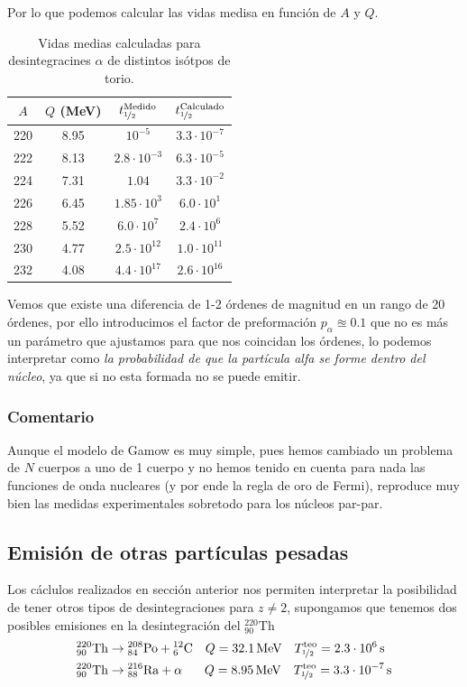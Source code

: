 Por lo que podemos calcular las vidas medisa en función de $A$ y $Q$.
\begin{table}[h!]
\centering
\begin{tabular}{|cccc|}
\hline
$A$ & $Q$ (MeV) & $t^\mathrm{Medido}_{\nicefrac{1}{2}}$  & $t^\mathrm{Calculado}_{\nicefrac{1}{2}}$  \\ 
\hline \hline
220 & 8.95 & $10^{-5}$ & $3.3 \cdot 10^{-7}$ \\
222 & 8.13 & $2.8 \cdot 10^{-3}$ & $6.3 \cdot 10^{-5}$ \\
224 & 7.31 & $1.04$ & $3.3 \cdot 10^{-2}$ \\
226 & 6.45 & $1.85 \cdot 10^{3}$ & $6.0 \cdot 10^{1}$ \\
228 & 5.52 & $6.0 \cdot 10^{7}$ & $2.4 \cdot 10^{6}$ \\
230 & 4.77 & $2.5 \cdot 10^{12}$ & $1.0 \cdot 10^{11}$ \\
232 & 4.08 & $4.4 \cdot 10^{17}$ & $2.6 \cdot 10^{16}$ \\
\hline
\end{tabular}
\caption{Vidas medias calculadas para desintegracines $\alpha$ de distintos isótpos de torio.}
\label{tab: desintegraciones del torio}
\end{table}

Vemos que existe una diferencia de 1-2 órdenes de magnitud en un rango de 20 órdenes, por ello introducimos el factor de preformación $p_\alpha\approxeq 0.1$ que no es más un parámetro que ajustamos para que nos coincidan los órdenes, lo podemos interpretar como \textit{la probabilidad de que la partícula alfa se forme dentro del núcleo}, ya que si no esta formada no se puede emitir.
\newpage
\subsubsection{Comentario}
Aunque el modelo de Gamow es muy simple, pues hemos cambiado un problema de $N$ cuerpos a uno de 1 cuerpo y no hemos tenido en cuenta para nada las funciones de onda nucleares (y por ende la regla de oro de Fermi), reproduce muy bien las medidas experimentales sobretodo para los núcleos par-par.
\subsection{Emisión de otras partículas pesadas}
Los cáclulos realizados en sección anterior nos permiten interpretar la posibilidad de tener otros tipos de desintegraciones para $z\neq 2$, supongamos que tenemos dos posibles emisiones en la desintegración del $^{220}_{90} \mathrm{Th}$
\begin{equation*}
\begin{aligned}
{}^{220}_{90}\text{Th} &\to {}^{208}_{84}\text{Po} + {}^{12}_{6}\text{C} 
\quad Q = 32.1 \, \text{MeV} \quad T_{\nicefrac{1}{2}}^{\text{teo}} = 2.3 \cdot 10^6 \, \text{s} \\
{}^{220}_{90}\text{Th} &\to {}^{216}_{88}\text{Ra} + \alpha 
\quad \ \, \; Q = 8.95 \, \text{MeV} \quad T_{\nicefrac{1}{2}}^{\text{teo}} = 3.3 \cdot 10^{-7} \, \text{s}
\end{aligned}
\end{equation*}

